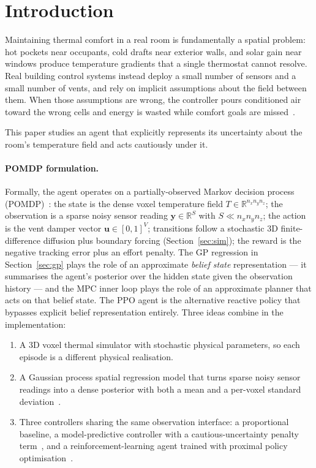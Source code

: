 \documentclass[11pt,letterpaper]{article}
\begin{document}
\section{Introduction}

Maintaining thermal comfort in a real room is fundamentally a spatial
problem: hot pockets near occupants, cold drafts near exterior walls, and
solar gain near windows produce temperature gradients that a single
thermostat cannot resolve. Real building control systems instead deploy
a small number of sensors and a small number of vents, and rely on
implicit assumptions about the field between them. When those assumptions
are wrong, the controller pours conditioned air toward the wrong cells
and energy is wasted while comfort goals are missed~\citep{ashrae55}.

This paper studies an agent that explicitly represents its uncertainty
about the room's temperature field and acts cautiously under it.

\paragraph{POMDP formulation.}
Formally, the agent operates on a partially-observed Markov decision
process (POMDP)~\citep{russell2020}: the state is the dense voxel
temperature field $T \in \mathbb{R}^{n_x n_y n_z}$; the observation
is a sparse noisy sensor reading $\mathbf{y} \in \mathbb{R}^S$ with
$S \ll n_x n_y n_z$; the action is the vent damper vector
$\mathbf{u} \in [0,1]^V$; transitions follow a stochastic 3D
finite-difference diffusion plus boundary forcing
(Section~\ref{sec:sim}); the reward is the negative tracking error
plus an effort penalty. The GP regression in
Section~\ref{sec:gp} plays the role of an approximate \emph{belief
state} representation --- it summarises the agent's posterior over the
hidden state given the observation history --- and the MPC inner loop
plays the role of an approximate planner that acts on that belief
state. The PPO agent is the alternative reactive policy that bypasses
explicit belief representation entirely. Three ideas combine in the
implementation:

\begin{enumerate}
\item A 3D voxel thermal simulator with stochastic physical parameters,
      so each episode is a different physical realisation.
\item A Gaussian process spatial regression model that turns sparse
      noisy sensor readings into a dense posterior with both a mean and
      a per-voxel standard deviation~\citep{rasmussen2006}.
\item Three controllers sharing the same observation interface: a
      proportional baseline, a model-predictive controller with a
      cautious-uncertainty penalty term~\citep{camacho2007}, and a
      reinforcement-learning agent trained with proximal policy
      optimisation~\citep{schulman2017,raffin2021}.
\end{enumerate}
\end{document}
